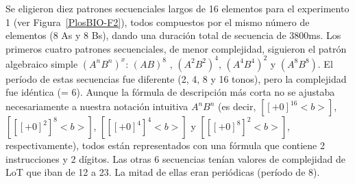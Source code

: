 Se eligieron diez patrones secuenciales largos de 16 elementos para el experimento 1 (ver Figura~\ref{PlosBIO-F2}), todos compuestos por el mismo número de elementos (8 As y 8 Bs), dando una duración total de secuencia de 3800ms. Los primeros cuatro patrones secuenciales, de menor complejidad, siguieron el patrón algebraico simple $(A^nB^n)^x$: $(AB)^8$ , $(A^2B^2)^4$, $(A^4B^4)^2$ y $(A^8B^8)$. El período de estas secuencias fue diferente (2, 4, 8 y 16 tonos), pero la complejidad fue idéntica (\mdlbin = 6). Aunque la fórmula de descripción más corta no se ajustaba necesariamente a nuestra notación intuitiva $A^nB^n$ (es decir, $[[+0]^{16}<b>]$, $[[[+0]^2]^ 8 <b>]$, $[[ [+0] ^ 4] ^ 4 <b>]$ y $[[[+0] ^ 8] ^ 2 <b>]$, respectivamente), todos están representados con una fórmula que contiene 2 instrucciones y 2 dígitos. Las otras 6 secuencias tenían valores de complejidad de LoT que iban de 12 a 23. La mitad de ellas eran periódicas (período de 8).


